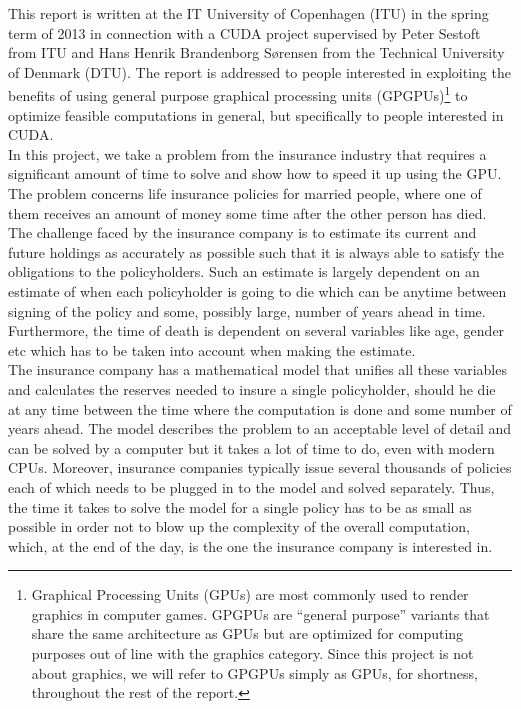 This report is written at the IT University of Copenhagen (ITU) in the spring term of 2013 in connection with a CUDA project supervised by Peter Sestoft from ITU and Hans Henrik Brandenborg Sørensen from the Technical University of Denmark (DTU). The report is addressed to people interested in exploiting the benefits of using general purpose graphical processing units (GPGPUs)\footnote{Graphical Processing Units (GPUs) are most commonly used to render graphics in computer games. GPGPUs are ``general purpose'' variants that share the same architecture as GPUs but are optimized for computing purposes out of line with the graphics category. Since this project is not about graphics, we will refer to GPGPUs simply as GPUs, for shortness, throughout the rest of the report.} to optimize feasible computations in general, but specifically to people interested in CUDA. \\

In this project, we take a problem from the insurance industry that requires a significant amount of time to solve and show how to speed it up using the GPU. The problem concerns life insurance policies for married people, where one of them receives an amount of money some time after the other person has died. The challenge faced by the insurance company is to estimate its current and future holdings as accurately as possible such that it is always able to satisfy the obligations to the policyholders. Such an estimate is largely dependent on an estimate of when each policyholder is going to die which can be anytime between signing of the policy and some, possibly large, number of years ahead in time. Furthermore, the time of death is dependent on several variables like age, gender etc which has to be taken into account when making the estimate.\\

The insurance company has a mathematical model that unifies all these variables and calculates the reserves needed to insure a single policyholder, should he die at any time between the time where the computation is done and some number of years ahead. The model describes the problem to an acceptable level of detail and can be solved by a computer but it takes a lot of time to do, even with modern CPUs. Moreover, insurance companies typically issue several thousands of policies each of which needs to be plugged in to the model and solved separately. Thus, the time it takes to solve the model for a single policy has to be as small as possible in order not to blow up the complexity of the overall computation, which, at the end of the day, is the one the insurance company is interested in. \\

